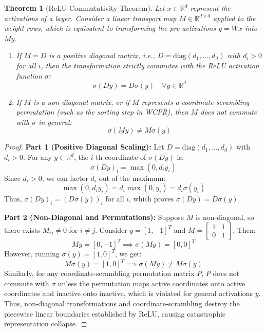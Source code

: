 \documentclass{article}
\theoremstyle{plain}
\newtheorem{theorem}{Theorem}[section]
\theoremstyle{definition}
\theoremstyle{remark}
\begin{document}
\begin{theorem}[ReLU Commutativity Theorem]
  Let $x \in \mathbb{R}^d$ represent the activations of a layer. Consider a linear transport map $M \in \mathbb{R}^{d \times d}$ applied to the weight rows, which is equivalent to transforming the pre-activations $y = W x$ into $M y$. 
  \begin{enumerate}
    \item If $M = D$ is a positive diagonal matrix, i.e., $D = \mathrm{diag}(d_1, \dots, d_d)$ with $d_i > 0$ for all $i$, then the transformation strictly commutes with the ReLU activation function $\sigma$:
    \begin{equation}
      \sigma(D y) = D \sigma(y) \quad \forall y \in \mathbb{R}^d
    \end{equation}
    \item If $M$ is a non-diagonal matrix, or if $M$ represents a coordinate-scrambling permutation (such as the sorting step in WCPR), then $M$ does not commute with $\sigma$ in general:
    \begin{equation}
      \sigma(M y) \neq M \sigma(y)
    \end{equation}
  \end{enumerate}
\end{theorem}

\begin{proof}
  \textbf{Part 1 (Positive Diagonal Scaling):}
  Let $D = \mathrm{diag}(d_1, \dots, d_d)$ with $d_i > 0$. For any $y \in \mathbb{R}^d$, the $i$-th coordinate of $\sigma(D y)$ is:
  \begin{equation}
    \sigma(D y)_i = \max(0, d_i y_i)
  \end{equation}
  Since $d_i > 0$, we can factor $d_i$ out of the maximum:
  \begin{equation}
    \max(0, d_i y_i) = d_i \max(0, y_i) = d_i \sigma(y_i)
  \end{equation}
  Thus, $\sigma(D y)_i = (D \sigma(y))_i$ for all $i$, which proves $\sigma(D y) = D \sigma(y)$.
  
  \textbf{Part 2 (Non-Diagonal and Permutations):}
  Suppose $M$ is non-diagonal, so there exists $M_{ij} \neq 0$ for $i \neq j$. Consider $y = [1, -1]^T$ and $M = \begin{bmatrix} 1 & 1 \\ 0 & 1 \end{bmatrix}$. Then:
  \begin{equation}
    M y = [0, -1]^T \implies \sigma(M y) = [0, 0]^T
  \end{equation}
  However, running $\sigma(y) = [1, 0]^T$, we get:
  \begin{equation}
    M \sigma(y) = [1, 0]^T \implies \sigma(M y) \neq M \sigma(y)
  \end{equation}
  Similarly, for any coordinate-scrambling permutation matrix $P$, $P$ does not commute with $\sigma$ unless the permutation maps active coordinates onto active coordinates and inactive onto inactive, which is violated for general activations $y$. Thus, non-diagonal transformations and coordinate-scrambling destroy the piecewise linear boundaries established by ReLU, causing catastrophic representation collapse.
\end{proof}
\end{document}
